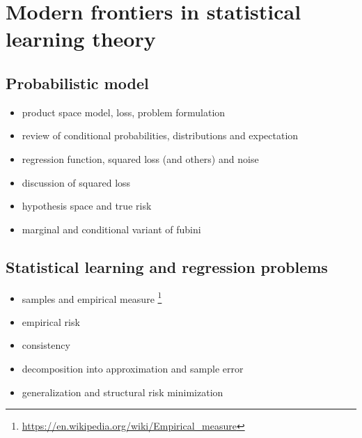 \chapter{Modern frontiers in statistical learning theory}
\label{chapter:learning}

\section{Probabilistic model}
\begin{itemize}
    \item product space model, loss, problem formulation 
        \cite{smale_learning}
    \item review of conditional probabilities, distributions 
        and expectation \cite{billingsley,dudley,royden}
    \item regression function, squared loss (and others) and 
        noise \cite{smale_learning}
    \item discussion of squared loss \cite{fitwithoutfear}
    \item hypothesis space and true risk 
        \cite{smale_learning}
    \item marginal and conditional variant of
        fubini \cite{dudley,billingsley}
\end{itemize}

\section{Statistical learning and regression problems}
\begin{itemize}
    \item samples and empirical measure
        \footnote{\url{https://en.wikipedia.org/wiki/Empirical_measure}}
    \item empirical risk
    \item consistency \cite{vapnik}
    \item decomposition into approximation and sample error 
        \cite{smale_learning}
    \item generalization and structural risk minimization
        \cite{vapnik}
\end{itemize}


